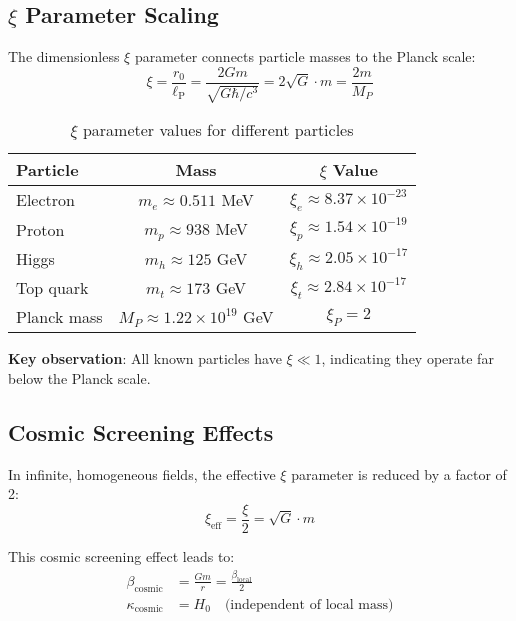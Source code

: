 \documentclass[12pt,a4paper]{article}
\newcommand{\lP}{\ell_{\text{P}}}
\newcommand{\xipar}{\xi}
\newcommand{\Hzero}{H_0}
\newcommand{\kappaparam}{\kappa}
\begin{document}
	\subsection{$\xi$ Parameter Scaling}
	\label{subsec:xi_scaling}
	
	The dimensionless $\xi$ parameter connects particle masses to the Planck scale:
	\begin{equation}
		\xipar = \frac{r_0}{\lP} = \frac{2Gm}{\sqrt{G\hbar/c^3}} = 2\sqrt{G} \cdot m = \frac{2m}{M_P}
	\end{equation}
	
	\begin{table}[htbp]
		\centering
		\begin{tabular}{lcc}
			\toprule
			\textbf{Particle} & \textbf{Mass} & \textbf{$\xi$ Value} \\
			\midrule
			Electron & $m_e \approx 0.511$ MeV & $\xi_e \approx 8.37 \times 10^{-23}$ \\
			Proton & $m_p \approx 938$ MeV & $\xi_p \approx 1.54 \times 10^{-19}$ \\
			Higgs & $m_h \approx 125$ GeV & $\xi_h \approx 2.05 \times 10^{-17}$ \\
			Top quark & $m_t \approx 173$ GeV & $\xi_t \approx 2.84 \times 10^{-17}$ \\
			Planck mass & $M_P \approx 1.22 \times 10^{19}$ GeV & $\xi_P = 2$ \\
			\bottomrule
		\end{tabular}
		\caption{$\xi$ parameter values for different particles}
		\label{tab:xi_values}
	\end{table}
	
	\textbf{Key observation}: All known particles have $\xi \ll 1$, indicating they operate far below the Planck scale.
	
	\subsection{Cosmic Screening Effects}
	\label{subsec:cosmic_screening}
	
	In infinite, homogeneous fields, the effective $\xi$ parameter is reduced by a factor of 2:
	\begin{equation}
		\xi_{\text{eff}} = \frac{\xi}{2} = \sqrt{G} \cdot m
		\label{eq:xi_effective}
	\end{equation}
	
	This cosmic screening effect leads to:
	\begin{align}
		\beta_{\text{cosmic}} &= \frac{Gm}{r} = \frac{\beta_{\text{local}}}{2} \\
		\kappaparam_{\text{cosmic}} &= \Hzero \quad \text{(independent of local mass)}
	\end{align}
	
\end{document}
